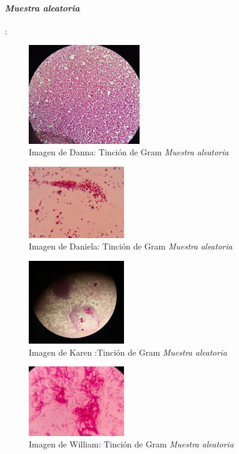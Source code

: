 \documentclass[journal,transmag]{IEEEtran}
\begin{document}
\paragraph{\large \textit{\textbf{Muestra aleatoria}}}: 
	\begin{figure}[!h] 
	\center 
	\includegraphics[width=4.9cm]{I4.png} 
	\caption{Imagen de Danna: Tinción de Gram \textit{Muestra aleatoria} } 
	\label{I1}
	\end{figure} 
	\begin{figure}[!h] 
	\center 
	\includegraphics[width=4.2cm]{I8.jpg} 
	\caption{Imagen de Daniela: Tinción de Gram \textit{Muestra aleatoria} } 
	\label{I1}
	\end{figure} 
	\begin{figure}[!h] 
	\center 
	\includegraphics[width=4.2cm]{I12.png} 
	\caption{Imagen de Karen :Tinción de Gram \textit{Muestra aleatoria} } 
	\label{I1}
	\end{figure} 
	\begin{figure}[!h] 
	\center 
	\includegraphics[width=4.2cm]{I16.jpg} 
	\caption{Imagen de William: Tinción de Gram \textit{Muestra aleatoria} } 
	\label{I1}
	\end{figure} 
\vspace{50mm} 
\end{document}
